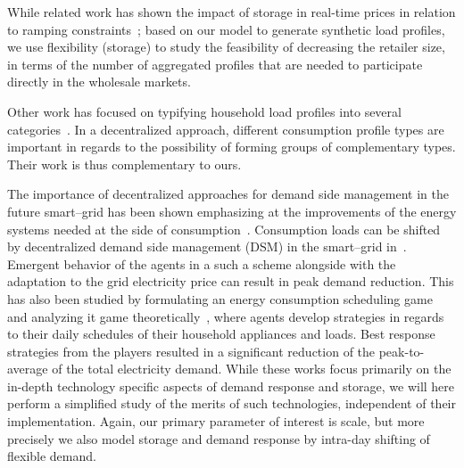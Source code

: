 \documentclass[conference]{IEEEtran}
\begin{document}
While related work has shown the impact of storage in real-time prices in relation to ramping constraints~\cite{gast2013impact, faghih2011optimal}; based on our model to generate synthetic load profiles, we use flexibility (storage) to study the feasibility of decreasing the retailer size, in terms of the number of aggregated profiles that are needed to participate directly in the wholesale markets.

Other work has focused on typifying household load profiles into several categories~\cite{flath2012cluster,hayn2014electricity}. In a decentralized approach, different consumption profile types are important in regards to the possibility of forming groups of complementary types. Their work is thus complementary to ours.

The importance of decentralized approaches for demand side management in the future smart--grid has been shown emphasizing at the improvements of the energy systems needed at the side of consumption~\cite{palensky2011demand}. Consumption loads can be shifted by decentralized demand side management (DSM) in the smart--grid in~\cite{Ramchurn2011a}. Emergent behavior of the agents in a such a scheme alongside with the adaptation to the grid electricity price can result in peak demand reduction. This has also been studied by formulating an energy consumption scheduling game and analyzing it game theoretically~\cite{Mohsenian-Rad2010}, where agents develop strategies in regards to their daily schedules of their household appliances and loads. Best response strategies from the players resulted in a significant reduction of the peak-to-average of the total electricity demand. 
While these works focus primarily on the in-depth technology specific aspects of demand response and storage, we will here perform a simplified study of the merits of such technologies, independent of their implementation. Again, our primary parameter of interest is scale, but more precisely we also model storage and demand response by intra-day shifting of flexible demand.
\end{document}
